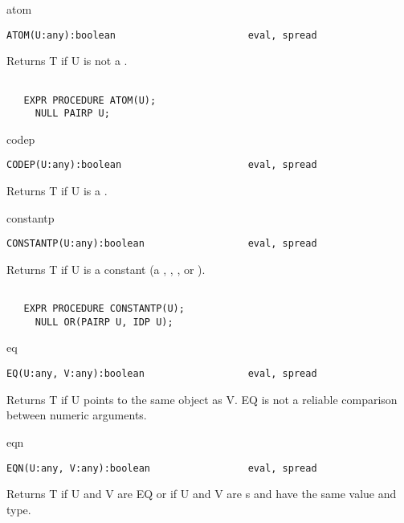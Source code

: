 \begin{Function}{atom}
\begin{verbatim}
ATOM(U:any):boolean                       eval, spread
\end{verbatim}
   Returns T if U is not a .
\begin{verbatim}

   EXPR PROCEDURE ATOM(U);
     NULL PAIRP U;
\end{verbatim}
\end{Function}
\begin{Function}{codep}
\begin{verbatim}
CODEP(U:any):boolean                      eval, spread
\end{verbatim}
   Returns T if U is a .
\end{Function}
\begin{Function}{constantp}
\begin{verbatim}
CONSTANTP(U:any):boolean                  eval, spread
\end{verbatim}
   Returns   T   if  U   is   a  constant   (a  ,  
  , , or ).
\begin{verbatim}

   EXPR PROCEDURE CONSTANTP(U);
     NULL OR(PAIRP U, IDP U);
\end{verbatim}
\end{Function}
\begin{Function}{eq}
\begin{verbatim}
EQ(U:any, V:any):boolean                  eval, spread
\end{verbatim} 
  Returns  T if U  points to the same  object as V.  EQ is not a
   reliable comparison between numeric arguments.
\end{Function}
\begin{Function}{eqn}
\begin{verbatim}
EQN(U:any, V:any):boolean                 eval, spread
\end{verbatim}
   Returns  T if U  and V are  EQ or if  U and V  are 
   s and   have the same value and type.

\end{Function}
